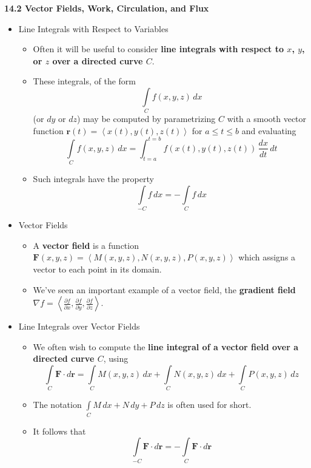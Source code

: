 \documentclass[12pt]{article}
\theoremstyle{plain}
\theoremstyle{definition}
\theoremstyle{remark}
\newcommand{\ds}{\displaystyle}
\newcommand{\vect}[1]{\mathbf{#1}}
\newcommand{\dvar}[1]{\,d{#1}}
\begin{document}
	\newpage
	
	\centerline{\bf 14.2 Vector Fields, Work, Circulation, and Flux}
	
	\begin{itemize}
	
	\item Line Integrals with Respect to Variables
	
		\begin{itemize}
			\item Often it will be useful to consider \textbf{line integrals with respect to $x$, $y$, or $z$ over a directed curve $C$}.
			\item These integrals, of the form \[\int\limits_C f(x,y,z)\,dx\] (or $dy$ or $dz$) may be computed by parametrizing $C$ with a smooth vector function $\vect{r}(t)=\left<x(t),y(t),z(t)\right>$ for $a\leq t\leq b$ and evaluating \[\int\limits_C f(x,y,z)\dvar{x} = \int_{t=a}^{t=b} f(x(t),y(t),z(t))\,\frac{dx}{dt}\dvar{t}\]
			\item Such integrals have the property \[\int\limits_{-C} f\dvar{x} = -\int\limits_{C} f\dvar{x}\]
		\end{itemize}
	
	\item Vector Fields
	
		\begin{itemize}
		\item A \textbf{vector field} is a function $\vect{F}(x,y,z)=\left<M(x,y,z),N(x,y,z),P(x,y,z)\right>$ which assigns a vector to each point in its domain.
		\item We've seen an important example of a vector field, the \textbf{gradient field} $\nabla f = \left<\frac{\partial f}{\partial x}, \frac{\partial f}{\partial y},\frac{\partial f}{\partial z}\right>$.
		\end{itemize}
	
	\item Line Integrals over Vector Fields
	
		\begin{itemize}
		\item We often wish to compute the \textbf{line integral of a vector field over a directed curve $C$}, using \[\int\limits_C \vect{F}\cdot d\vect{r} = \int\limits_C M(x,y,z)\,dx + \int\limits_C N(x,y,z)\,dx + \int\limits_C P(x,y,z)\,dz\]
		\item The notation $\ds \int\limits_C M\,dx + N\,dy + P\,dz$ is often used for short.
		\item It follows that \[\int\limits_{-C} \vect{F}\cdot d\vect{r} = - \int\limits_C \vect{F}\cdot d\vect{r}\]
		\end{itemize}
		

\end{itemize}
\end{document}
